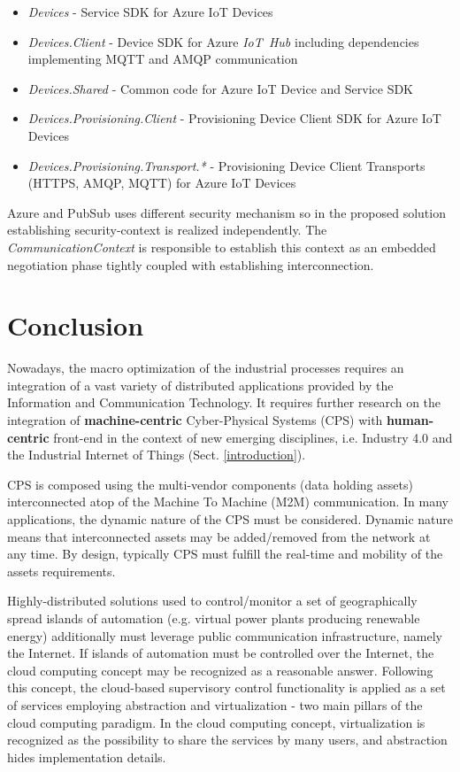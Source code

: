 \documentclass{article}
\begin{document}
\begin{itemize}
      \item \textit{Devices} - Service SDK for Azure IoT Devices
      \item \textit{Devices.Client} - Device SDK for Azure \textit{IoT\ Hub} including dependencies implementing MQTT and AMQP communication
      \item \textit{Devices.Shared} - Common code for Azure IoT Device and Service SDK
      \item \textit{Devices.Provisioning.Client} - Provisioning Device Client SDK for Azure IoT Devices
      \item \textit{Devices.Provisioning.Transport.*} - Provisioning Device Client Transports (HTTPS, AMQP, MQTT) for Azure IoT Devices
\end{itemize}

Azure and PubSub uses different security mechanism so in the proposed solution establishing security-context is realized independently. The \textit{CommunicationContext} is responsible to establish this context as an embedded negotiation phase tightly coupled with establishing interconnection.

\section{Conclusion}\label{section.conclusion}

Nowadays, the macro optimization of the industrial processes requires an integration of a vast variety of distributed applications provided by the Information and Communication Technology. It requires further research on the integration of \textbf{machine-centric} Cyber-Physical Systems (CPS) with \textbf{human-centric} front-end in the context of new emerging disciplines, i.e. Industry 4.0 and the Industrial Internet of Things (Sect. \ref*{introduction}).

CPS is composed using the multi-vendor components (data holding assets) interconnected atop of the Machine To Machine (M2M) communication. In many applications, the dynamic nature of the CPS must be considered. Dynamic nature means that interconnected assets may be added/removed from the network at any time. By design, typically CPS must fulfill the real-time and mobility of the assets requirements.

Highly-distributed solutions used to control/monitor a set of geographically spread islands of automation (e.g. virtual power plants producing renewable energy) additionally must leverage public communication infrastructure, namely the Internet. If islands of automation must be controlled over the Internet, the cloud computing concept may be recognized as a reasonable answer. Following this concept, the cloud-based supervisory control functionality is applied as a set of services employing abstraction and virtualization - two main pillars of the cloud computing paradigm. In the cloud computing concept, virtualization is recognized as the possibility to share the services by many users, and abstraction hides implementation details.
\end{document}
